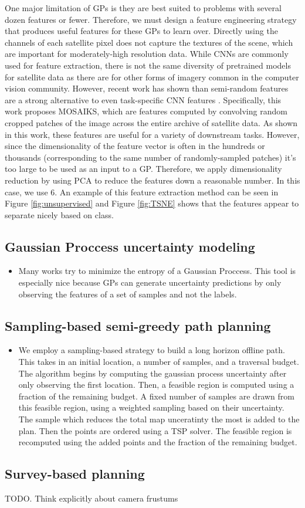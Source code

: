 \begin{itemize}
    One major limitation of GPs is they are best suited to problems with several dozen features or fewer. Therefore, we must design a feature engineering strategy that produces useful features for these GPs to learn over. Directly using the channels of each satellite pixel does not capture the textures of the scene, which are important for moderately-high resolution data. While CNNs are commonly used for feature extraction, there is not the same diversity of pretrained models for satellite data as there are for other forms of imagery common in the computer vision community. However, recent work has shown than semi-random features are a strong alternative to even task-specific CNN features \cite{Rolf2021}. Specifically, this work proposes MOSAIKS, which are features computed by convolving random cropped patches of the image across the entire archive of satellite data. As shown in this work, these features are useful for a variety of downstream tasks. However, since the dimensionality of the feature vector is often in the hundreds or thousands (corresponding to the same number of randomly-sampled patches) it's too large to be used as an input to a GP. Therefore, we apply dimensionality reduction by using PCA to reduce the features down a reasonable number. In this case, we use 6. An example of this feature extraction method can be seen in Figure \ref{fig:unsupervised} and Figure \ref{fig:TSNE} shows that the features appear to separate nicely based on class.


    
\end{itemize}
\subsection{Gaussian Proccess uncertainty modeling}
\begin{itemize}
    \item Many works try to minimize the entropy of a Gaussian Proccess. This tool is especially nice because GPs can generate uncertainty predictions by only observing the features of a set of samples and not the labels.
\end{itemize}
\subsection{Sampling-based semi-greedy path planning}
\begin{itemize}
    \item We employ a sampling-based strategy to build a long horizon offline path. This takes in an initial location, a number of samples, and a traversal budget. The algorithm begins by computing the gaussian process uncertainty after only observing the first location. Then, a feasible region is computed using a fraction of the remaining budget. A fixed number of samples are drawn from this feasible region, using a weighted sampling based on their uncertainty. The sample which reduces the total map unceratinty the most is added to the plan. Then the points are ordered using a TSP solver. The feasible region is recomputed using the added points and the fraction of the remaining budget.
\end{itemize}
\subsection{Survey-based planning}
TODO. Think explicitly about camera frustums